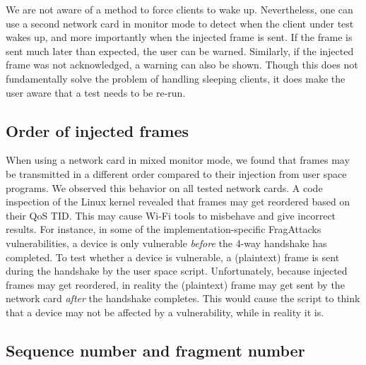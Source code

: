 \documentclass[sigconf]{acmart}
\newcommand{\wifi}{\mbox{Wi-Fi}}
\newcommand{\red}[1]{\textcolor{red}{#1}}
\begin{document}
We are not aware of a method to force clients to wake up.
Nevertheless, one can use a second network card in monitor mode to detect when the client under test wakes up, and more importantly when the injected frame is sent.
If the frame is sent much later than expected,
the user can be warned.
Similarly, if the injected frame was not acknowledged, a warning can also be shown.
Though this does not fundamentally solve the problem of handling sleeping clients, it does make the user aware that a test needs to be re-run.

\subsection{Order of injected frames}


When using a network card in mixed monitor mode, we found that frames may be transmitted in a different order compared to their injection from user space programs.
We observed this behavior on all tested network cards.
A code inspection of the Linux kernel revealed that frames may get reordered based on their QoS TID.
This may cause \wifi{} tools to misbehave and give incorrect results.
For instance, in some of the implementation-specific FragAttacks vulnerabilities, a device is only vulnerable \emph{before} the \mbox{4-way} handshake has completed.
To test whether a device is vulnerable, a (plaintext) frame is sent during the handshake by the user space script.
Unfortunately, because injected frames may get reordered, in reality the (plaintext) frame may get sent by the network card \emph{after} the handshake completes.
This would cause the script to think that a device may not be affected by a vulnerability, while in reality it is.

\subsection{Sequence number and fragment number}
\end{document}
